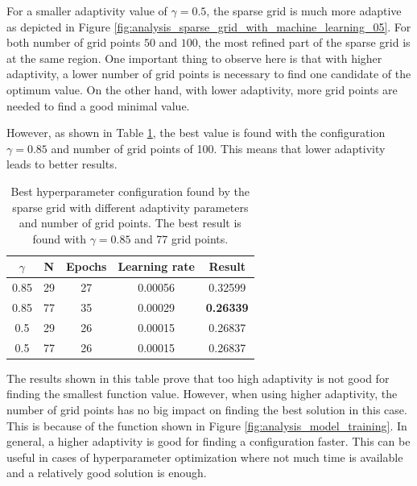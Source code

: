 For a smaller adaptivity value of $ \gamma = 0.5 $, the sparse grid is much more adaptive as depicted in Figure \ref{fig:analysis_sparse_grid_with_machine_learning_05}. For both number of grid points $ 50 $ and $ 100 $, the most refined part of the sparse grid is at the same region. One important thing to observe here is that with higher adaptivity, a lower number of grid points is necessary to find one candidate of the optimum value. On the other hand, with lower adaptivity, more grid points are needed to find a good minimal value. 

However, as shown in Table \ref{tab:analysis_sparse_grid_with_machine_learning_results}, the best value is found with the configuration $ \gamma = 0.85 $ and number of grid points of 100. This means that lower adaptivity leads to better results.

\begin{table}[htbp!]
	\centering
	\caption{ Best hyperparameter configuration found by the sparse grid with different adaptivity parameters and number of grid points. The best result is found with $ \gamma = 0.85 $ and 77 grid points. }
	\label{tab:analysis_sparse_grid_with_machine_learning_results}
	\begin{tabular}{| c c | c c | c |} 
		\hline
		$ \gamma $ & N &  Epochs & Learning rate & Result \\
		\hline
		0.85 & 29 & 27 & 0.00056 & 0.32599 \\
		0.85 & 77 & 35 & 0.00029 & \textbf{0.26339} \\
		0.5 & 29 & 26 & 0.00015 & 0.26837 \\
		0.5 & 77 & 26 & 0.00015 & 0.26837 \\
		\hline
	\end{tabular}
\end{table}

The results shown in this table prove that too high adaptivity is not good for finding the smallest function value. However, when using higher adaptivity, the number of grid points has no big impact on finding the best solution in this case. This is because of the function shown in Figure \ref{fig:analysis_model_training}. In general, a higher adaptivity is good for finding a configuration faster. This can be useful in cases of hyperparameter optimization where not much time is available and a relatively good solution is enough. 

